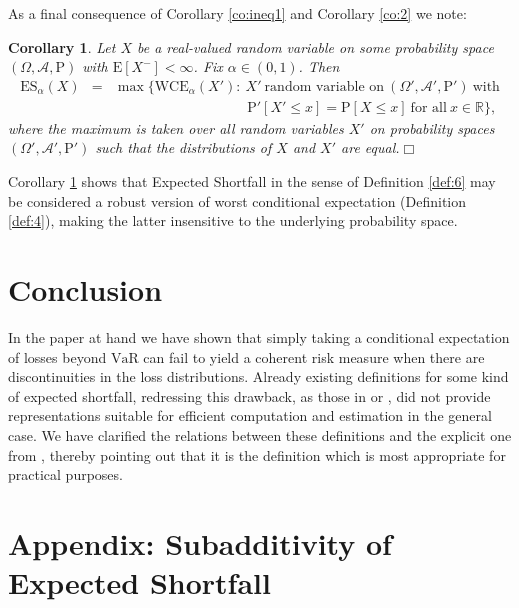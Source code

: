 \documentclass[11pt,a4paper,leqno]{article}
\newtheorem{corollary}[theorem]{Corollary}
\begin{document}
As a final consequence of Corollary \ref{co:ineq1} and Corollary \ref{co:2} we note:
%
\begin{corollary}
  \label{co:3}
Let $X$ be a real-valued random variable on some probability space 
$(\Omega, \mathcal{A}, \mathrm{P})$ with $\mathrm{E}[X^-] < \infty$.
Fix $\alpha \in (0,1)$. Then
\begin{eqnarray*}
\mathrm{ES}_\alpha(X) & = & \max \Big\{ \mathrm{WCE}_\alpha(X'): \ X' \
\mbox{random variable on} \ (\Omega', \mathcal{A}', \mathrm{P}')\ \mbox{with} \\
& & \hspace{4cm} \mathrm{P}'[X' \le x] = \mathrm{P}[X \le x]
\ \mbox{for all}\ x\in \mathbb{R}\Big\},
\end{eqnarray*}
where the maximum is taken over all random variables $X'$ on probability
spaces $(\Omega', \mathcal{A}', \mathrm{P}')$ such that the distributions
of $X$ and $X'$ are equal.\hfill $\Box$
\end{corollary}
%
Corollary \ref{co:3} shows that Expected Shortfall in the sense of Definition
\ref{def:6}
may be considered a robust version of worst conditional expectation
(Definition
\ref{def:4}), making
the latter insensitive to the underlying probability space.

\section{Conclusion}
\label{sec:con}
\setcounter{equation}{0}

In the paper at hand we have shown that simply taking a conditional 
expectation of losses beyond $\mathrm{VaR}$ can fail to yield a coherent
risk measure when there are discontinuities in the loss distributions.
Already existing definitions for some kind of expected shortfall, redressing
this drawback,
as those in \cite{ADEH99} or \cite{Pf00}, did not provide representations
suitable for efficient computation and estimation in the general case.
We have clarified the relations between these definitions and the explicit one
from \cite{ANS}, thereby pointing out that it is the definition which is
most appropriate for practical purposes.

\newpage


\appendix

\section{Appendix: Subadditivity of Expected Shortfall} \label{appendice1}
\end{document}
